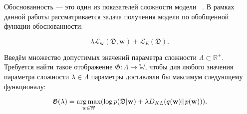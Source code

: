 \documentclass[12pt, twoside]{article}
\begin{document}
Обоснованность --- это один из показателей сложности модели ~\cite{conf/nips/Graves11}. В рамках данной работы рассматривается задача получения модели по обобщенной функции обоснованности:

\[ \lambda\mathcal{L}_{\mathbf{w}}(\mathfrak{D}, \mathbf{w}) + \mathcal{L}_E (\mathfrak{D}).\]

Введём множество допустимых значений параметра сложности $\varLambda \subset \mathbb{R}^+$.
Требуется найти такое отображение $\mathfrak{G}:\varLambda \longrightarrow \mathbb{W}$, чтобы для любого значения параметра сложности $\lambda \in \varLambda$  параметры доставляли бы максимум следующему функционалу:

\begin{equation}
\mathfrak{G}(\lambda) = \argmax\limits_{w \in \mathbb{W}} ( \log p(\mathfrak{D}| \mathbf{w})  + \lambda D_{KL}(q(\mathbf{w})||p(\mathbf{w})) ).
\end{equation}


\end{document}

